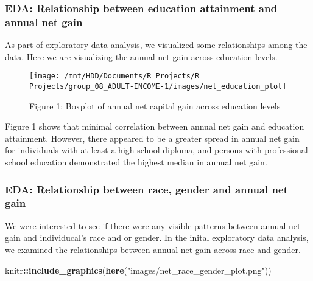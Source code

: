 \documentclass[]{article}
\newenvironment{Shaded}{\begin{snugshade}}{\end{snugshade}}
\newcommand{\KeywordTok}[1]{\textcolor[rgb]{0.13,0.29,0.53}{\textbf{#1}}}
\newcommand{\NormalTok}[1]{#1}
\newcommand{\OperatorTok}[1]{\textcolor[rgb]{0.81,0.36,0.00}{\textbf{#1}}}
\newcommand{\StringTok}[1]{\textcolor[rgb]{0.31,0.60,0.02}{#1}}
\begin{document}
\hypertarget{eda-relationship-between-education-attainment-and-annual-net-gain}{%
\subsubsection{EDA: Relationship between education attainment and annual
net
gain}\label{eda-relationship-between-education-attainment-and-annual-net-gain}}

As part of exploratory data analysis, we visualized some relationships
among the data. Here we are visualizing the annual net gain across
education levels.

\begin{figure}

{\centering \texttt{[image: /mnt/HDD/Documents/R\_Projects/R Projects/group\_08\_ADULT-INCOME-1/images/net\_education\_plot]} 

}

\caption{Figure 1: Boxplot of annual net capital gain across education levels}\label{fig:net-gain-education}
\end{figure}

Figure 1 shows that minimal correlation between annual net gain and
education attainment. However, there appeared to be a greater spread in
annual net gain for individuals with at least a high school diploma, and
persons with professional school education demonstrated the highest
median in annual net gain.

\hypertarget{eda-relationship-between-race-gender-and-annual-net-gain}{%
\subsubsection{EDA: Relationship between race, gender and annual net
gain}\label{eda-relationship-between-race-gender-and-annual-net-gain}}

We were interested to see if there were any visible patterns between
annual net gain and individucal's race and or gender. In the inital
exploratory data analysis, we examined the relationships between annual
net gain across race and gender.

\begin{Shaded}
\begin{Highlighting}[]
\NormalTok{knitr}\OperatorTok{::}\KeywordTok{include_graphics}\NormalTok{(}\KeywordTok{here}\NormalTok{(}\StringTok{"images/net_race_gender_plot.png"}\NormalTok{))}
\end{Highlighting}
\end{Shaded}
\end{document}
